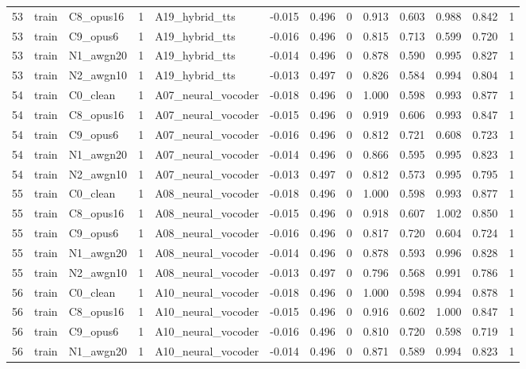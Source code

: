 \begin{tabular}{rllrlrrrrrrrr}
53 & train & C8_opus16 & 1 & A19_hybrid_tts & -0.015 & 0.496 & 0 & 0.913 & 0.603 & 0.988 & 0.842 & 1 \\
53 & train & C9_opus6 & 1 & A19_hybrid_tts & -0.016 & 0.496 & 0 & 0.815 & 0.713 & 0.599 & 0.720 & 1 \\
53 & train & N1_awgn20 & 1 & A19_hybrid_tts & -0.014 & 0.496 & 0 & 0.878 & 0.590 & 0.995 & 0.827 & 1 \\
53 & train & N2_awgn10 & 1 & A19_hybrid_tts & -0.013 & 0.497 & 0 & 0.826 & 0.584 & 0.994 & 0.804 & 1 \\
54 & train & C0_clean & 1 & A07_neural_vocoder & -0.018 & 0.496 & 0 & 1.000 & 0.598 & 0.993 & 0.877 & 1 \\
54 & train & C8_opus16 & 1 & A07_neural_vocoder & -0.015 & 0.496 & 0 & 0.919 & 0.606 & 0.993 & 0.847 & 1 \\
54 & train & C9_opus6 & 1 & A07_neural_vocoder & -0.016 & 0.496 & 0 & 0.812 & 0.721 & 0.608 & 0.723 & 1 \\
54 & train & N1_awgn20 & 1 & A07_neural_vocoder & -0.014 & 0.496 & 0 & 0.866 & 0.595 & 0.995 & 0.823 & 1 \\
54 & train & N2_awgn10 & 1 & A07_neural_vocoder & -0.013 & 0.497 & 0 & 0.812 & 0.573 & 0.995 & 0.795 & 1 \\
55 & train & C0_clean & 1 & A08_neural_vocoder & -0.018 & 0.496 & 0 & 1.000 & 0.598 & 0.993 & 0.877 & 1 \\
55 & train & C8_opus16 & 1 & A08_neural_vocoder & -0.015 & 0.496 & 0 & 0.918 & 0.607 & 1.002 & 0.850 & 1 \\
55 & train & C9_opus6 & 1 & A08_neural_vocoder & -0.016 & 0.496 & 0 & 0.817 & 0.720 & 0.604 & 0.724 & 1 \\
55 & train & N1_awgn20 & 1 & A08_neural_vocoder & -0.014 & 0.496 & 0 & 0.878 & 0.593 & 0.996 & 0.828 & 1 \\
55 & train & N2_awgn10 & 1 & A08_neural_vocoder & -0.013 & 0.497 & 0 & 0.796 & 0.568 & 0.991 & 0.786 & 1 \\
56 & train & C0_clean & 1 & A10_neural_vocoder & -0.018 & 0.496 & 0 & 1.000 & 0.598 & 0.994 & 0.878 & 1 \\
56 & train & C8_opus16 & 1 & A10_neural_vocoder & -0.015 & 0.496 & 0 & 0.916 & 0.602 & 1.000 & 0.847 & 1 \\
56 & train & C9_opus6 & 1 & A10_neural_vocoder & -0.016 & 0.496 & 0 & 0.810 & 0.720 & 0.598 & 0.719 & 1 \\
56 & train & N1_awgn20 & 1 & A10_neural_vocoder & -0.014 & 0.496 & 0 & 0.871 & 0.589 & 0.994 & 0.823 & 1 \\

\end{tabular}
